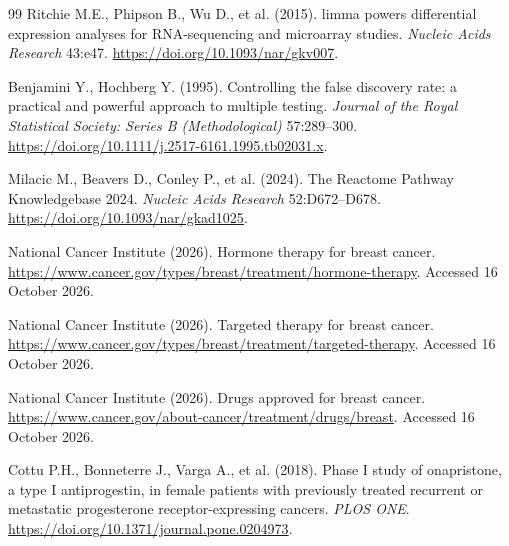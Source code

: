 \begin{thebibliography}{99}
 Ritchie M.E., Phipson B., Wu D., et al. (2015). limma powers differential expression analyses for RNA-sequencing and microarray studies. \textit{Nucleic Acids Research} 43:e47. \url{https://doi.org/10.1093/nar/gkv007}.

 Benjamini Y., Hochberg Y. (1995). Controlling the false discovery rate: a practical and powerful approach to multiple testing. \textit{Journal of the Royal Statistical Society: Series B (Methodological)} 57:289--300. \url{https://doi.org/10.1111/j.2517-6161.1995.tb02031.x}.

 Milacic M., Beavers D., Conley P., et al. (2024). The Reactome Pathway Knowledgebase 2024. \textit{Nucleic Acids Research} 52:D672--D678. \url{https://doi.org/10.1093/nar/gkad1025}.

 National Cancer Institute (2026). Hormone therapy for breast cancer. \url{https://www.cancer.gov/types/breast/treatment/hormone-therapy}. Accessed 16 October 2026.

 National Cancer Institute (2026). Targeted therapy for breast cancer. \url{https://www.cancer.gov/types/breast/treatment/targeted-therapy}. Accessed 16 October 2026.

 National Cancer Institute (2026). Drugs approved for breast cancer. \url{https://www.cancer.gov/about-cancer/treatment/drugs/breast}. Accessed 16 October 2026.

 Cottu P.H., Bonneterre J., Varga A., et al. (2018). Phase I study of onapristone, a type I antiprogestin, in female patients with previously treated recurrent or metastatic progesterone receptor-expressing cancers. \textit{PLOS ONE}. \url{https://doi.org/10.1371/journal.pone.0204973}.
\end{thebibliography}
